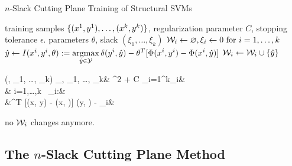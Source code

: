 \begin{algorithm*}[t]
    \caption{$n$-Slack Cutting Plane Training of Structural SVMs \label{alg_n_slack}}
    \begin{doublespacing}
    \begin{algorithmic}[1]
        \Require training samples $\{ (x^{1}, y^{1}), \dots, (x^{k}, y^{k})\}$, regularization parameter $C$, stopping tolerance $\epsilon$.
        \Ensure parameters $\theta$, slack $(\xi_1, \dotsc, \xi_k)$
        \State $\mathcal{W}_i \leftarrow \varnothing, \xi_i \leftarrow 0 \text{ for } i=1,\dots,k$
        \Repeat
                \State
                $\hat{y} \leftarrow I(x^{i}, y^{i}, \theta) := \displaystyle \operatorname*{argmax}_{\hat{y}\in\mathcal{Y}} \delta(y^{i}, \hat{y}) - \theta^T [\Phi(x^{i}, y^{i}) - \Phi(x^{i}, \hat{y})] $
                \State \hspace{-3mm}$\mathcal{W}_i \leftarrow \mathcal{W}_i \cup \{ \hat{y}\} $
                    \State
                    \vspace{-15mm}
                    \begin{flalign*}
                        \qquad\qquad(\theta, \xi_1, \dots, \xi_k) \leftarrow \displaystyle \argmin_{\theta, \xi_1, \dots, \xi_k}& ^2 + C \sum_{i=1}^k\xi_i&\\
                        &  i=1,\dots,k\ \forall {} \in \W_i:&\\
                                    &\theta^T [\Phi(x, y) - \Phi(x, )] \geq \delta(y, ) - \xi_i&
                    \end{flalign*}
                \EndIf
            \EndFor
            \vspace{-10mm}
            \Until no $\mathcal{W}_i$ changes anymore.
        \end{algorithmic}
    \end{doublespacing}
    \end{algorithm*}

\subsection{The $n$-Slack Cutting Plane Method}

